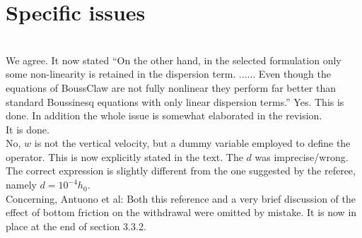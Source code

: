 \documentclass[11pt]{article}
\begin{document}
\section*{Specific issues}
\begin{enumerate}
\\
We agree. It now stated ``On the other hand, in the selected formulation only some non-linearity is retained in
the dispersion term. ......
Even though the equations of BoussClaw are not fully nonlinear they perform far better
than standard Boussinesq equations with only linear dispersion terms.''
Yes. This is done. In addition the whole issue is somewhat elaborated in the revision.
\\
It is  done.
\\
No, $w$ is not the vertical velocity, but a dummy variable employed to define the operator.
This is now explicitly stated in the text.
The $d$ was imprecise/wrong. The correct expression is slightly different from the one suggested by
the referee, namely $d=10^{-4}h_0$.\\
Concerning, Antuono et al: Both this reference and a very brief discussion of the effect of bottom friction on 
the withdrawal were omitted by mistake. It is now in place at the end of section 3.3.2.


\end{enumerate}
\end{document}

